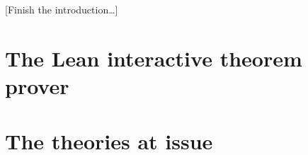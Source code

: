 \documentclass{article}
\theoremstyle{definition}
\theoremstyle{remark}
\begin{document}
[Finish the introduction\dots]

\section{The Lean interactive theorem prover}
\label{s:lean}


\section{The theories at issue}
\label{s:theories}

\printbibliography
\end{document}
